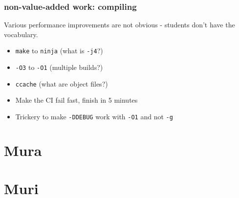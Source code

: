 \documentclass[8pt]{beamer}
\begin{document}
\begin{frame}
  \frametitle{non-value-added work: compiling}

  Various performance improvements are not obvious - students don't have the vocabulary.
  \begin{itemize}
    \item \texttt{make} to \texttt{ninja} (what is \texttt{-j4}?)
    \item \texttt{-O3} to \texttt{-O1} (multiple builds?)
    \item \texttt{ccache} (what are object files?)
    \item Make the CI fail fast, finish in 5 minutes
    \item Trickery to make \texttt{-DDEBUG} work with \texttt{-O1} and not \texttt{-g}
  \end{itemize}
\end{frame}

\section{Mura}

\section{Muri}
\end{document}

